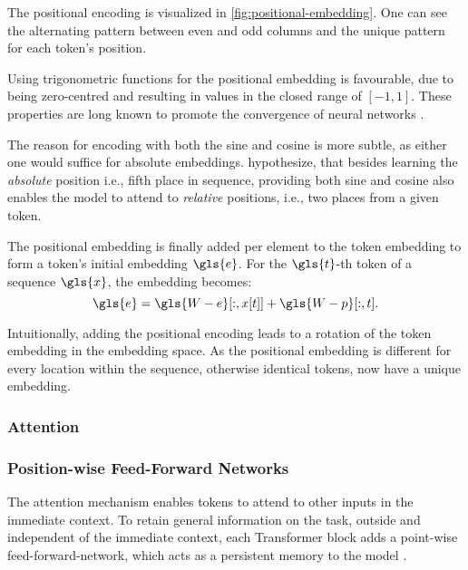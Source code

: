 The positional encoding is visualized in \cref{fig:positional-embedding}. One can see the alternating pattern between even and odd columns and the unique pattern for each token's position.

Using trigonometric functions for the positional embedding is favourable, due to being zero-centred and resulting in values in the closed range of $[-1,1]$. These properties are long known to promote the convergence of neural networks \autocites[][8-9]{lecunEfficientBackProp2012}[][2]{ioffeBatchNormalizationAccelerating2015}.

The reason for encoding with both the sine and cosine is more subtle, as either one would suffice for absolute embeddings. \textcite[][6]{vaswaniAttentionAllYou2017} hypothesize, that besides learning the \emph{absolute} position i.e., fifth place in sequence, providing both sine and cosine also enables the model to attend to \emph{relative} positions, i.e., two places from a given token.

The positional embedding is finally added per element to the token embedding to form a token's initial embedding $\gls{e}$. For the $\gls{t}$-th token of a sequence $\gls{x}$, the embedding becomes:
\begin{equation}
    \gls{e}=\gls{W-e}[:, x[t]]+\gls{W-p}[:, t].
    \label{eq:positional-embedding}
\end{equation}

Intuitionally, adding the positional encoding leads to a rotation of the token embedding in the embedding space. As the positional embedding is different for every location within the sequence, otherwise identical \glspl{token}, now have a unique embedding.

\subsubsection{Attention}\label{sec:attention}

\subsubsection{Position-wise Feed-Forward Networks}\label{sec:position-wise-ffn}

The attention mechanism enables tokens to attend to other inputs in the immediate context. To retain general information on the task, outside and independent of the immediate context, each Transformer block adds a point-wise \gls{feed-forward-network}, which acts as a persistent memory to the model \autocite[][3]{sukhbaatarAugmentingSelfattentionPersistent2019}.

